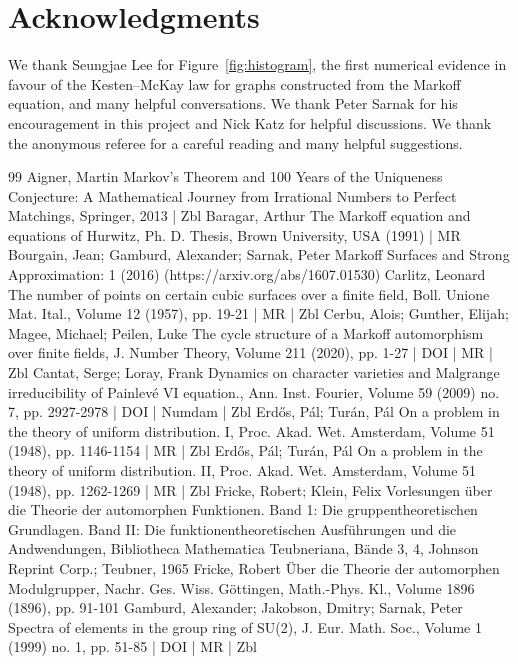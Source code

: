\documentclass[10pt]{amsart}
\theoremstyle{definition}\newtheorem{defi}[theo]{Definition}\newtheorem{rema}[theo]{Remark}\newtheorem{exam}[theo]{Example}\newtheorem{exem}[theo]{Example}\newtheorem{nota}[theo]{Notation}
\begin{document}
\section*{Acknowledgments}
We thank Seungjae Lee for Figure~\ref{fig:histogram}, the first numerical evidence in favour of the Kesten--McKay law for graphs constructed from the Markoff equation, and many helpful conversations. We thank Peter Sarnak for his encouragement in this project and Nick Katz for helpful discussions. We thank the anonymous referee for a careful reading and many helpful suggestions.




\begin{thebibliography}{99}
Aigner, Martin Markov’s Theorem and 100 Years of the Uniqueness Conjecture: A Mathematical Journey from Irrational Numbers to Perfect Matchings, Springer, 2013 | Zbl
Baragar, Arthur The Markoff equation and equations of Hurwitz, Ph. D. Thesis, Brown University, USA (1991) | MR
Bourgain, Jean; Gamburd, Alexander; Sarnak, Peter Markoff Surfaces and Strong Approximation: 1 (2016) (https://arxiv.org/abs/1607.01530)
Carlitz, Leonard The number of points on certain cubic surfaces over a finite field, Boll. Unione Mat. Ital., Volume 12 (1957), pp. 19-21 | MR | Zbl
Cerbu, Alois; Gunther, Elijah; Magee, Michael; Peilen, Luke The cycle structure of a Markoff automorphism over finite fields, J. Number Theory, Volume 211 (2020), pp. 1-27 | DOI | MR | Zbl
Cantat, Serge; Loray, Frank Dynamics on character varieties and Malgrange irreducibility of Painlevé VI equation., Ann. Inst. Fourier, Volume 59 (2009) no. 7, pp. 2927-2978 | DOI | Numdam | Zbl
Erdős, Pál; Turán, Pál On a problem in the theory of uniform distribution. I, Proc. Akad. Wet. Amsterdam, Volume 51 (1948), pp. 1146-1154 | MR | Zbl
Erdős, Pál; Turán, Pál On a problem in the theory of uniform distribution. II, Proc. Akad. Wet. Amsterdam, Volume 51 (1948), pp. 1262-1269 | MR | Zbl
Fricke, Robert; Klein, Felix Vorlesungen über die Theorie der automorphen Funktionen. Band 1: Die gruppentheoretischen Grundlagen. Band II: Die funktionentheoretischen Ausführungen und die Andwendungen, Bibliotheca Mathematica Teubneriana, Bände 3, 4, Johnson Reprint Corp.; Teubner, 1965
Fricke, Robert Über die Theorie der automorphen Modulgrupper, Nachr. Ges. Wiss. Göttingen, Math.-Phys. Kl., Volume 1896 (1896), pp. 91-101
Gamburd, Alexander; Jakobson, Dmitry; Sarnak, Peter Spectra of elements in the group ring of SU(2), J. Eur. Math. Soc., Volume 1 (1999) no. 1, pp. 51-85 | DOI | MR | Zbl

\end{thebibliography}
\end{document}
